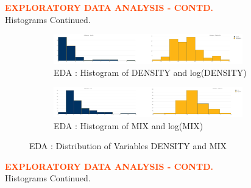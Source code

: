 \pagebreak

\textbf{\textcolor{OrangeRed}{EXPLORATORY DATA ANALYSIS - CONTD.}}\\

Histograms Continued.\\

\begin{figure}[!ht]
	\begin{subfigure}[b]{1.0\textwidth}
		\centering
		\includegraphics[width=0.9\textwidth,height=0.30\textheight]{images/EDA_histograms_density.jpg}
		\caption{EDA : Histogram of DENSITY and log(DENSITY)}
		\label{fig:EDA Histogram DENSITY}
	\end{subfigure}\vspace{3mm}%
	
	\begin{subfigure}[b]{1.0\textwidth}
		\centering
		\includegraphics[width=0.9\textwidth,height=0.30\textheight]{images/EDA_histograms_mix.jpg}
		\caption{EDA : Histogram of MIX and log(MIX)}
		\label{fig:EDA Histogram MIX}
	\end{subfigure}
	\label{fig:DENSITY and MIX Histogram}
	\caption{EDA : Distribution of Variables DENSITY and MIX}
\end{figure}

\pagebreak

\textbf{\textcolor{OrangeRed}{EXPLORATORY DATA ANALYSIS - CONTD.}}\\

Histograms Continued.\\

